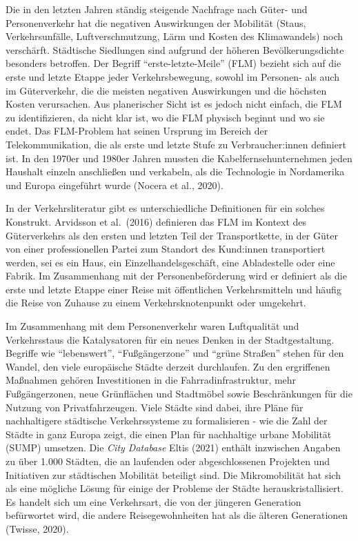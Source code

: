 \documentclass[
]{book}
\begin{document}
Die in den letzten Jahren ständig steigende Nachfrage nach Güter- und Personenverkehr hat die negativen Auswirkungen der Mobilität (Staus, Verkehrsunfälle, Luftverschmutzung, Lärm und Kosten des Klimawandels) noch verschärft. Städtische Siedlungen sind aufgrund der höheren Bevölkerungsdichte besonders betroffen. Der Begriff ``erste-letzte-Meile'' (FLM) bezieht sich auf die erste und letzte Etappe jeder Verkehrsbewegung, sowohl im Personen- als auch im Güterverkehr, die die meisten negativen Auswirkungen und die höchsten Kosten verursachen. Aus planerischer Sicht ist es jedoch nicht einfach, die FLM zu identifizieren, da nicht klar ist, wo die FLM physisch beginnt und wo sie endet. Das FLM-Problem hat seinen Ursprung im Bereich der Telekommunikation, die als erste und letzte Stufe zu Verbraucher:innen definiert ist. In den 1970er und 1980er Jahren mussten die Kabelfernsehunternehmen jeden Haushalt einzeln anschließen und verkabeln, als die Technologie in Nordamerika und Europa eingeführt wurde (Nocera et al., 2020).

In der Verkehrsliteratur gibt es unterschiedliche Definitionen für ein solches Konstrukt. Arvidsson et al.~(2016) definieren das FLM im Kontext des Güterverkehrs als den ersten und letzten Teil der Transportkette, in der Güter von einer professionellen Partei zum Standort des Kund:innen transportiert werden, sei es ein Haus, ein Einzelhandelsgeschäft, eine Abladestelle oder eine Fabrik. Im Zusammenhang mit der Personenbeförderung wird er definiert als die erste und letzte Etappe einer Reise mit öffentlichen Verkehrsmitteln und häufig die Reise von Zuhause zu einem Verkehrsknotenpunkt oder umgekehrt.

Im Zusammenhang mit dem Personenverkehr waren Luftqualität und Verkehrsstaus die Katalysatoren für ein neues Denken in der Stadtgestaltung. Begriffe wie ``lebenswert'', ``Fußgängerzone'' und ``grüne Straßen'' stehen für den Wandel, den viele europäische Städte derzeit durchlaufen. Zu den ergriffenen Maßnahmen gehören Investitionen in die Fahrradinfrastruktur, mehr Fußgängerzonen, neue Grünflächen und Stadtmöbel sowie Beschränkungen für die Nutzung von Privatfahrzeugen. Viele Städte sind dabei, ihre Pläne für nachhaltigere städtische Verkehrssysteme zu formalisieren - wie die Zahl der Städte in ganz Europa zeigt, die einen Plan für nachhaltige urbane Mobilität (SUMP) umsetzen. Die \emph{City Database} \textbar{} Eltis (2021) enthält inzwischen Angaben zu über 1.000 Städten, die an laufenden oder abgeschlossenen Projekten und Initiativen zur städtischen Mobilität beteiligt sind. Die Mikromobilität hat sich als eine mögliche Lösung für einige der Probleme der Städte herauskristallisiert. Es handelt sich um eine Verkehrsart, die von der jüngeren Generation befürwortet wird, die andere Reisegewohnheiten hat als die älteren Generationen (Twisse, 2020).
\end{document}
